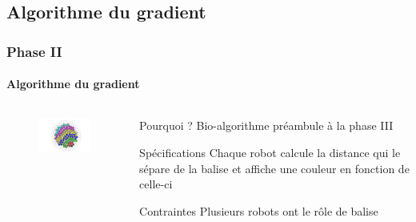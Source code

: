 \documentclass[xcolor=table]{beamer}
\begin{document}
\subsection{Algorithme du gradient}
\begin{frame}[fragile]
  \frametitle{Phase II}
  \framesubtitle{Algorithme du gradient}
  \begin{columns}[T] %
    \begin{column}{.48\textwidth}
      \bigskip
      \bigskip
      \begin{figure}[!h]
        \includegraphics[width=6cm]{gradient.png}
      \end{figure}
    \end{column}%
    \hfill%
    \begin{column}{.48\textwidth}
      \begin{block}{Pourquoi ?}
        Bio-algorithme préambule à la phase III
      \end{block}
      \pause
      \begin{block}{Spécifications}
        Chaque robot calcule la distance qui le sépare de la balise et affiche une couleur en fonction de celle-ci
      \end{block}
      \pause
      \begin{block}{Contraintes}
        Plusieurs robots ont le r\^ole de balise
      \end{block}
    \end{column}
  \end{columns}
\end{frame}

\end{document}
